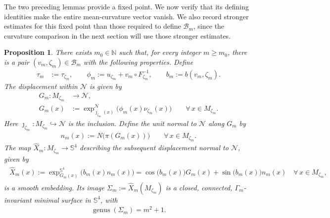 \documentclass[a4paper,11pt,oneside,reqno]{amsart}
\numberwithin{equation}{section}
\newtheorem{proposition}[theorem]{Proposition}
\theoremstyle{definition}
\begin{document}
The two preceding lemmas provide a fixed point. We now verify
that its defining identities make the entire mean-curvature vector
vanish. We also record stronger estimates for this fixed point
than those required to define $\mathcal B_m$, since the curvature
comparison in the next section will use those stronger estimates.

\begin{proposition}
    \label{prop:s4-coupled-existence}
    There exists $m_0\in\mathbb N$ such that, for every integer
    $m\geq m_0$, there is a pair
    $(v_m,\zeta_m)\in\mathcal B_m$ with the following properties.
    Define
    \begin{align*}
        \tau_m&:=\tau_{\zeta_m},\qquad
        \phi_m:=u_{\zeta_m}+v_m\circ F_{\zeta_m}^{-1},
        \qquad b_m:=b(v_m,\zeta_m).
    \end{align*}
    The displacement within $\mathcal N$ is given by
    \begin{align*}
        G_m:M_{\zeta_m}&\rightarrow\mathcal N,\\
        G_m(x)&:=\exp_{\jmath_{\zeta_m}(x)}^{\mathcal N}
        \bigl(\phi_m(x)\nu_{\zeta_m}(x)\bigr)
        \qquad\forall\,x\in M_{\zeta_m}.
    \end{align*}
    Here $\jmath_{\zeta_m}:M_{\zeta_m}\hookrightarrow\mathcal N$
    is the inclusion. Define the unit normal to $\mathcal N$
    along $G_m$ by
    \begin{align*}
        n_m(x):=N\bigl(\pi(G_m(x))\bigr)
        \qquad\forall\,x\in M_{\zeta_m}.
    \end{align*}
    The map $\widehat X_m:M_{\zeta_m}\rightarrow\mathbb S^4$ describing the subsequent displacement normal to $\mathcal N$, given by 
    \begin{align}
        \label{eq:s4-final-embedding}
        \begin{split}
            \widehat X_m(x):=\exp_{G_m(x)}^{\mathbb S^4}
            \bigl(b_m(x)n_m(x)\bigr)=\cos\bigl(b_m(x)\bigr)G_m(x)
            +\sin\bigl(b_m(x)\bigr)n_m(x)
            \quad\forall\,x\in M_{\zeta_m},
        \end{split}
    \end{align}
    is a smooth embedding. Its image
    $\Sigma_m:=\widehat X_m(M_{\zeta_m})$ is a closed, connected,
    $\Gamma_m$-invariant minimal surface in $\mathbb S^4$, with
    \begin{align}
        \label{eq:s4-final-genus}
        \operatorname{genus}(\Sigma_m)=m^2+1.

\end{align}
\end{proposition}
\end{document}
